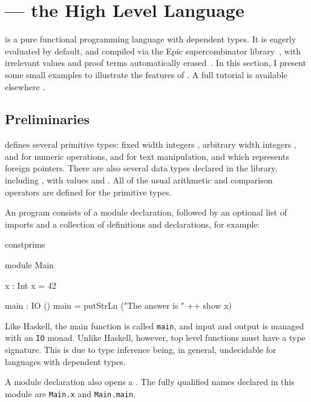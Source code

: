 \section{\Idris{} --- the High Level Language}

\label{sect:hll}

\Idris{} is
a pure functional programming language with dependent types. It is
eagerly evaluated by default, and compiled via the Epic supercombinator
library~\cite{brady2011epic}, with irrelevant values and proof terms
automatically erased~\cite{Brady2003,Brady2005}.
In this section, I present some small examples to illustrate
the features of \Idris{}.
A full tutorial is available elsewhere \cite{idristutorial}. 

\subsection{Preliminaries}

\Idris{} defines several primitive types: fixed width integers
, arbitrary width integers , and
 for numeric operations,  and  for
text manipulation, and  which represents foreign pointers.
There are also several data types declared in the library, including
, with values  and . All of the usual
arithmetic and comparison operators are defined for the primitive types.

An \Idris{} program consists of a module declaration, followed by an optional
list of imports and a collection of definitions and declarations, for example:

\begin{SaveVerbatim}{constprims}

module Main

x : Int
x = 42

main : IO ()
main = putStrLn ("The answer is " ++ show x)

\end{SaveVerbatim}

\noindent
Like Haskell, the main function is called \texttt{main}, and input and output
is managed with an \texttt{IO} monad. Unlike Haskell, however,  top
level functions must have a type signature. This is due to type inference
being, in general, undecidable for languages with dependent types.

A module declaration also opens a . The fully qualified names
declared in this module are \texttt{Main.x} and \texttt{Main.main}.

